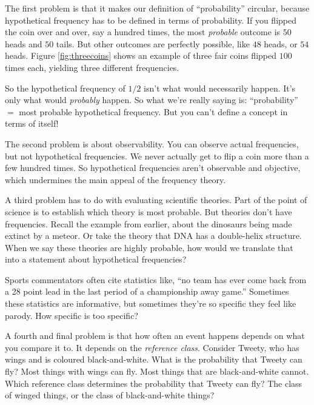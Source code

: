 \documentclass[justified]{tufte-book}
\theoremstyle{definition}
\theoremstyle{definition}
\theoremstyle{definition}
\theoremstyle{definition}
\theoremstyle{remark}
\begin{document}
The first problem is that it makes our definition of ``probability'' circular, because hypothetical frequency has to be defined in terms of probability. If you flipped the coin over and over, say a hundred times, the most \emph{probable} outcome is \(50\) heads and \(50\) tails. But other outcomes are perfectly possible, like \(48\) heads, or \(54\) heads. Figure \ref{fig:threecoins} shows an example of three fair coins flipped \(100\) times each, yielding three different frequencies.

So the hypothetical frequency of \(1/2\) isn't what would necessarily happen. It's only what would \emph{probably} happen. So what we're really saying is: ``probability'' \(=\) most probable hypothetical frequency. But you can't define a concept in terms of itself!

The second problem is about observability. You can observe actual frequencies, but not hypothetical frequencies. We never actually get to flip a coin more than a few hundred times. So hypothetical frequencies aren't observable and objective, which undermines the main appeal of the frequency theory.

A third problem has to do with evaluating scientific theories. Part of the point of science is to establish which theory is most probable. But theories don't have frequencies. Recall the example from earlier, about the dinosaurs being made extinct by a meteor. Or take the theory that DNA has a double-helix structure. When we say these theories are highly probable, how would we translate that into a statement about hypothetical frequencies?

\begin{marginfigure}
Sports commentators often cite statistics like, ``no team has ever come
back from a 28 point lead in the last period of a championship away
game.'' Sometimes these statistics are informative, but sometimes
they're so specific they feel like parody. How specific is too specific?
\end{marginfigure}

A fourth and final problem is that how often an event happens depends on what you compare it to. It depends on the \emph{reference class}. Consider Tweety, who has wings and is coloured black-and-white. What is the probability that Tweety can fly? Most things with wings can fly. Most things that are black-and-white cannot. Which reference class determines the probability that Tweety can fly? The class of winged things, or the class of black-and-white things?
\end{document}
